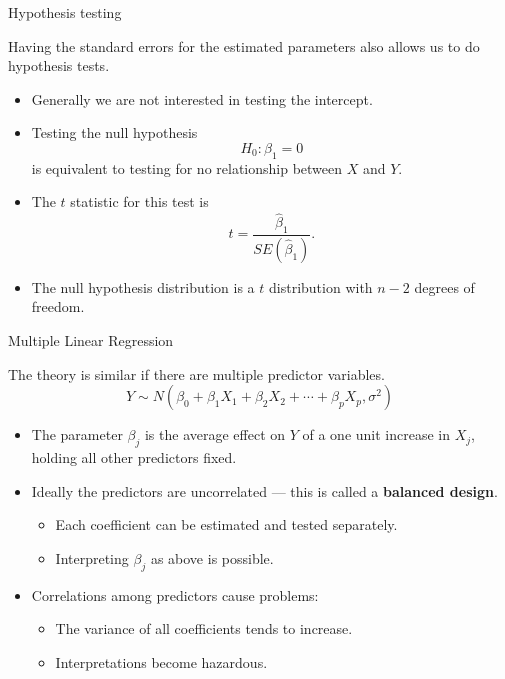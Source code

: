 \documentclass[
  ignorenonframetext,
]{beamer}
\providecommand{\tightlist}{%
  \setlength{\itemsep}{0pt}\setlength{\parskip}{0pt}}
\begin{document}
\begin{frame}{Hypothesis testing}
\protect\hypertarget{hypothesis-testing}{}

Having the standard errors for the estimated parameters also allows us
to do hypothesis tests.

\begin{itemize}
\tightlist
\item
  Generally we are not interested in testing the intercept.
\item
  Testing the null hypothesis \[
  H_0: \beta_1=0
  \] is equivalent to testing for no relationship between \(X\) and
  \(Y\).
\item
  The \(t\) statistic for this test is \[
  t=\frac{\hat\beta_1}{SE(\hat\beta_1)}.
  \]
\item
  The null hypothesis distribution is a \(t\) distribution with \(n-2\)
  degrees of freedom.
\end{itemize}

\end{frame}

\begin{frame}{Multiple Linear Regression}
\protect\hypertarget{multiple-linear-regression}{}

The theory is similar if there are multiple predictor variables. \[
Y \sim N(\beta_0+\beta_1X_1+\beta_2X_2+\cdots+\beta_pX_p, \sigma^2)
\]

\begin{itemize}
\tightlist
\item
  The parameter \(\beta_j\) is the average effect on \(Y\) of a one unit
  increase in \(X_j\), holding all other predictors fixed.
\item
  Ideally the predictors are uncorrelated --- this is called a
  \textbf{balanced design}.

  \begin{itemize}
  \tightlist
  \item
    Each coefficient can be estimated and tested separately.
  \item
    Interpreting \(\beta_j\) as above is possible.
  \end{itemize}
\item
  Correlations among predictors cause problems:

  \begin{itemize}
  \tightlist
  \item
    The variance of all coefficients tends to increase.
  \item
    Interpretations become hazardous.
  \end{itemize}
\end{itemize}

\end{frame}
\end{document}
